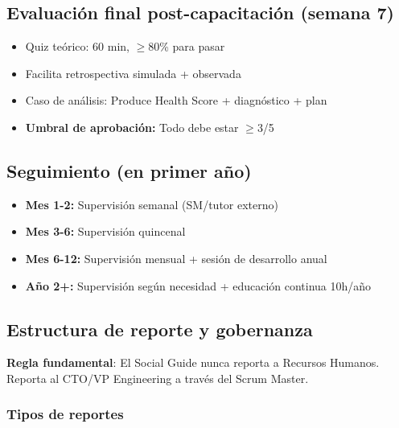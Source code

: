 \subsection*{Evaluación final post-capacitación (semana 7)}
\begin{itemize}
    \item Quiz teórico: 60 min, $\geq$80\% para pasar
    \item Facilita retrospectiva simulada + observada
    \item Caso de análisis: Produce Health Score + diagnóstico + plan
    \item \textbf{Umbral de aprobación:} Todo debe estar $\geq$3/5
\end{itemize}

\subsection*{Seguimiento (en primer año)}
\begin{itemize}
    \item \textbf{Mes 1-2:} Supervisión semanal (SM/tutor externo)
    \item \textbf{Mes 3-6:} Supervisión quincenal
    \item \textbf{Mes 6-12:} Supervisión mensual + sesión de desarrollo anual
    \item \textbf{Año 2+:} Supervisión según necesidad + educación continua 10h/año
\end{itemize}

\subsection{Estructura de reporte y gobernanza}

\textbf{Regla fundamental}: El Social Guide nunca reporta a Recursos Humanos. Reporta al CTO/VP Engineering a través del Scrum Master.

\subsubsection{Tipos de reportes}

